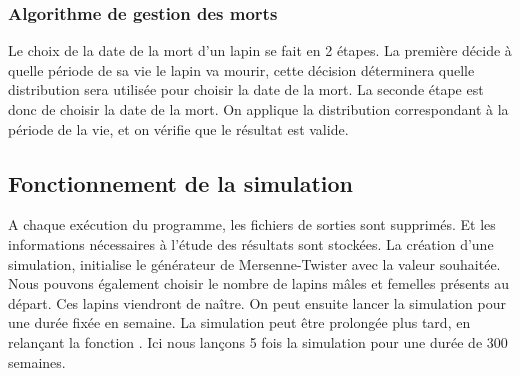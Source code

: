 \documentclass[11)pt,a4paper]{article}
\begin{document}
        \subsubsection{Algorithme de gestion des morts} 
            Le choix de la date de la mort d'un lapin se fait en 2 étapes. 
            La première décide à quelle période de sa vie le lapin va mourir, cette décision déterminera quelle distribution
            sera utilisée pour choisir la date de la mort.
            La seconde étape est donc de choisir la date de la mort. On applique la distribution correspondant à la période de la vie, et on vérifie que le résultat est valide.
            \begin{mdframed}[backgroundcolor=light-gray, roundcorner=20pt, innerleftmargin=20, innertopmargin=1, innerbottommargin=1, outerlinewidth=1, linecolor=darkgray]
                
            \end{mdframed}
    \subsection{Fonctionnement de la simulation}  
        A chaque exécution du programme, les fichiers de sorties sont supprimés. Et les informations nécessaires à l'étude des résultats sont stockées.
        La création d'une simulation, initialise le générateur de Mersenne-Twister avec la valeur souhaitée. Nous pouvons également choisir le nombre de lapins mâles et femelles présents au départ.
        Ces lapins viendront de naître.
        On peut ensuite lancer la simulation pour une durée fixée en semaine. La simulation peut être prolongée plus tard, en relançant la fonction .
        Ici nous lançons 5 fois la simulation pour une durée de 300 semaines.
        \begin{mdframed}[backgroundcolor=light-gray, roundcorner=20pt, innerleftmargin=20, innertopmargin=1, innerbottommargin=1, outerlinewidth=1, linecolor=darkgray]
            
        \end{mdframed}
\end{document}
